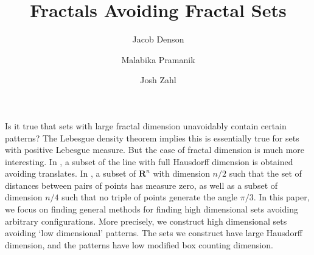 \documentclass[usenames,dvipsnames]{article}
\title{Fractals Avoiding Fractal Sets}
\author{Jacob Denson\\ \and Malabika Pramanik\\ \and Josh Zahl}
\theoremstyle{plain}
\theoremstyle{plain}
\begin{document}
\maketitle


\begin{abstract}
	\blindtext[1]
\end{abstract}


Is it true that sets with large fractal dimension unavoidably contain certain patterns? The Lebesgue density theorem implies this is essentially true for sets with positive Lebesgue measure. But the case of fractal dimension is much more interesting. In \cite{KeletiDimOneSet}, a subset of the line with full Hausdorff dimension is obtained avoiding translates. In \cite{Mathe}, a subset of $\mathbf{R}^n$ with dimension $n/2$ such that the set of distances between pairs of points has measure zero, as well as a subset of dimension $n/4$ such that no triple of points generate the angle $\pi/3$. In this paper, we focus on finding general methods for finding high dimensional sets avoiding arbitrary configurations. More precisely, we construct high dimensional sets avoiding `low dimensional' patterns. The sets we construct have large Hausdorff dimension, and the patterns have low modified box counting dimension.


%
%
\end{document}

